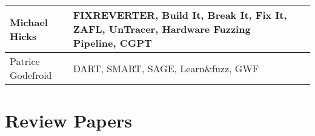 \documentclass{article}
\begin{document}
\begin{longtable}{|l|p{}|l|}
  Michael Hicks     & FIXREVERTER\cite{FIXREVERTER}, Build It, Break It, Fix It\cite{BuildItBreakItFixIt}, ZAFL\cite{ZAFL}, UnTracer\cite{UnTracer}, Hardware Fuzzing Pipeline\cite{HardwareFuzzingPipeline}, CGPT\cite{CGPT}                                             & \cite{EvaluatingFuzzTesting}                     \\\hline
  Patrice Godefroid & DART\cite{DART}, SMART\cite{SMART}, SAGE\cite{SAGE}, Learn\&fuzz\cite{LearnFuzz}, GWF\cite{GrammarBasedWhiteboxFuzzing}                                                                                                                             & \cite{PreliminaryAssessment}                     \\\hline
\end{longtable}

\pagebreak
\section{Review Papers}
\end{document}
